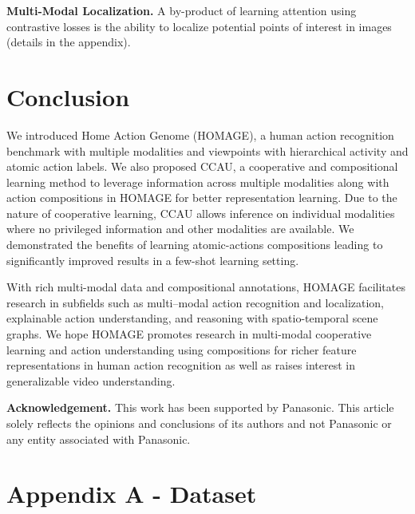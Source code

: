 \documentclass[final]{cvpr}
\begin{document}
\noindent\textbf{Multi-Modal Localization.} A by-product of learning attention using contrastive losses is the ability to localize potential points of interest in images (details in the appendix).

\section{Conclusion}

We introduced Home Action Genome (HOMAGE), a human action recognition benchmark with multiple modalities and viewpoints with hierarchical activity and atomic action labels. We also proposed CCAU, a cooperative and compositional learning method to leverage information across multiple modalities along with action compositions in HOMAGE for better representation learning. Due to the nature of cooperative learning, CCAU allows inference on individual modalities where no privileged information and other modalities are available. We demonstrated the benefits of learning atomic-actions compositions leading to significantly improved results in a few-shot learning setting.

With rich multi-modal data and compositional annotations, HOMAGE facilitates research in subfields such as multi--modal action recognition and localization, explainable action understanding, and reasoning with spatio-temporal scene graphs. We hope HOMAGE promotes research in multi-modal cooperative learning and action understanding using compositions for richer feature representations in human action recognition as well as raises interest in generalizable video understanding.



\noindent\textbf{Acknowledgement.}
This work has been supported by Panasonic. This article solely reflects the opinions and conclusions of its authors and not Panasonic or any entity associated with Panasonic.

{\small


}









\clearpage

\renewcommand\thefigure{A.\arabic{figure}}    
\setcounter{figure}{0}   
\renewcommand\thetable{A.\arabic{table}}    
\setcounter{table}{0}   

\section*{Appendix A - Dataset}
\label{sec:dataset}
\end{document}
